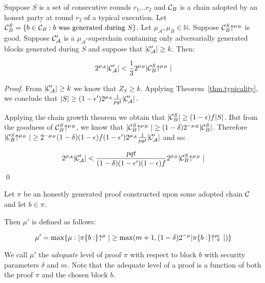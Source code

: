 \begin{lemma}\label{lem.level-comparison}
    Suppose $S$ is a set of consecutive rounds $r_1 \ldots r_2$
    and $\mathcal{C}_B$ is
    a chain adopted by an honest party at round $r_2$ of a typical execution.
    Let $\mathcal{C}_B^S = \{b \in
    \mathcal{C}_B: b \textnormal{ was generated during } S\}$. Let $\mu_\mathcal{A},
    \mu_B \in \mathbb{N}$. Suppose $\mathcal{C}_B^S\negthickspace\uparrow^{\mu_B}$ is good.
    Suppose $\mathcal{C}'_\mathcal{A}$ is a $\mu_\mathcal{A}$-superchain containing
    only adversarially generated blocks generated during $S$ and suppose that
    $|\mathcal{C}'_\mathcal{A}| \geq k$.
    Then:

    \begin{equation*}
    2^{\mu_\mathcal{A}}|\mathcal{C}'_\mathcal{A}| < \frac{1}{3}2^{\mu_B}|\mathcal{C}_B^S\negthickspace\uparrow^{\mu_B}|
    \end{equation*}
\end{lemma}
\begin{proof}
    From $|\mathcal{C}'_\mathcal{A}| \geq k$ we know that $Z_S \geq k$. Applying
    Theorem~\ref{thm.typicality}, we conclude that $|S| \geq (1 -
    \epsilon')2^{\mu_A}\frac{1}{pqt}|\mathcal{C}'_\mathcal{A}|$.

    Applying the chain growth theorem \cite{backbone} we obtain that $|\mathcal{C}_B^S|
    \geq (1 - \epsilon)f|S|$. But from the goodness of $\mathcal{C}_B^S\negthickspace\uparrow^{\mu_B}$, we
    know that $|\mathcal{C}_B^S\negthickspace\uparrow^{\mu_B}| \geq (1 -
    \delta)2^{-\mu_B}|\mathcal{C}_B^S|$. Therefore $|\mathcal{C}_B^S\negthickspace\uparrow^{\mu_B}| \geq
    2^{-\mu_B}(1 - \delta)(1 - \epsilon)f(1 -
    \epsilon')2^{\mu_\mathcal{A}}\frac{1}{pqt}|\mathcal{C}'_\mathcal{A}|$ and so:

    \begin{equation*}
    2^{\mu_\mathcal{A}}|\mathcal{C}'_\mathcal{A}|
    <
    \frac{pqt}{(1 - \delta)(1 -
    \epsilon')(1 - \epsilon)f}2^{\mu_B}|\mathcal{C}_B^S\negthickspace\uparrow^{\mu_B}|
    \end{equation*}
    \qed
\end{proof}

\begin{definition}
Let $\pi$ be an honestly generated proof constructed upon some adopted chain
$\mathcal{C}$ and let $b \in \pi$.

Then $\mu'$ is defined as follows:

\begin{equation*}
\mu' = \max\{\mu: |\pi\{b:\}\negthickspace\uparrow^\mu| \geq \max(m + 1, (1 -
\delta)2^{-\mu}|\pi\{b:\}\negthickspace\uparrow^\mu\negthickspace\downarrow\,|)\}
\end{equation*}

We call $\mu'$ the \textit{adequate} level of proof $\pi$ with respect to
block $b$ with security parameters $\delta$ and $m$. Note that the adequate
level of a proof is a function of both the proof $\pi$ and the chosen block $b$.
\end{definition}

